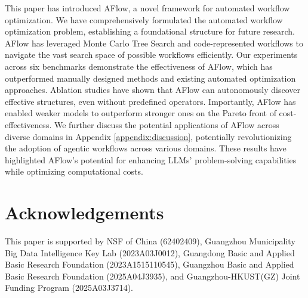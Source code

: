 \documentclass{article} %
\newcommand{\model}{{\sc AFlow}\xspace}
\theoremstyle{plain}
\theoremstyle{definition}
\theoremstyle{remark}
\begin{document}

This paper has introduced \model, a novel framework for automated workflow optimization. We have comprehensively formulated the automated workflow optimization problem, establishing a foundational structure for future research. \model has leveraged Monte Carlo Tree Search and code-represented workflows to navigate the vast search space of possible workflows efficiently. Our experiments across six benchmarks demonstrate the effectiveness of \model, which has outperformed manually designed methods and existing automated optimization approaches. Ablation studies have shown that \model can autonomously discover effective structures, even without predefined operators. Importantly, \model has enabled weaker models to outperform stronger ones on the Pareto front of cost-effectiveness. We further discuss the potential applications of \model across diverse domains in Appendix \ref{appendix:discussion}, potentially revolutionizing the adoption of agentic workflows across various domains. These results have highlighted \model's potential for enhancing LLMs' problem-solving capabilities while optimizing computational costs.




\clearpage
\section*{Acknowledgements}
This paper is supported by NSF of China (62402409), Guangzhou Municipality Big Data Intelligence Key Lab (2023A03J0012), Guangdong Basic and Applied Basic Research Foundation (2023A1515110545), Guangzhou Basic and Applied Basic Research Foundation (2025A04J3935), and  Guangzhou-HKUST(GZ) Joint Funding Program (2025A03J3714).
\end{document}
